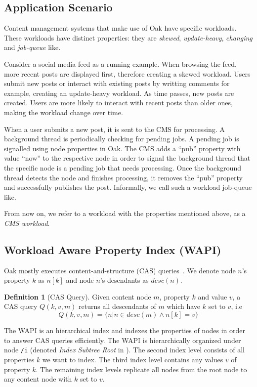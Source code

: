 \documentclass[abstracton,12pt]{scrartcl}
\theoremstyle{definition}
\newtheorem{definition}{Definition}
\begin{document}
\subsection{Application Scenario}
\label{sec:application_scenario}

Content management systems that make use of Oak have specific workloads.
These workloads have distinct properties: they are \textit{skewed},
\textit{update-heavy}, \textit{changing} \cite{KW17} and
\textit{job-queue} like.

Consider a social media feed as a running example. When
browsing the feed, more recent posts are displayed first, therefore creating a
skewed workload. Users submit new posts or interact with existing posts by
writting comments for example, creating an update-heavy workload. As time
passes, new posts are created. Users are more likely to interact with recent
posts than older ones, making the workload change over time.

When a user submits a new post, it is sent to the CMS for processing. A
background thread is periodically checking for pending jobs. A pending job is
signalled using node properties in Oak.
The CMS adds a ``pub'' property with value ``now'' to the respective node  in
order to signal the background thread that the specific node is a pending job that needs
processing. Once the
background thread detects the node and finishes processing, it removes the ``pub'' property and
successfully publishes the post. Informally, we call such a workload
job-queue like.

From now on, we refer to a workload with the properties mentioned above, as
a \textit{CMS workload}.

\subsection{Workload Aware Property Index (WAPI)}
\label{sec:wapi}

Oak mostly executes content-and-structure (CAS) queries~\cite{CM15}.
We denote node $n$'s property $k$ as $n[k]$ and node $n$'s desendants as
$desc(n)$.

\begin{definition}[CAS Query]
  Given content node $m$, property $k$ and value $v$, a CAS query
  $Q(k,v,m)$ returns all descendants of $m$ which have $k$ set to $v$, i.e
  $$ Q(k,v,m) = \{ n | n \in desc(m) \land n[k] = v\} $$
\end{definition}

The WAPI is an hierarchical index and indexes the properties of nodes in order
to answer CAS queries efficiently.
The WAPI is hierarchically organized under node \texttt{/i} (denoted
\textit{Index Subtree Root} in ).
The second index level consists of all properties $k$ we want
to index. The third index level contains any values $v$ of property $k$.
The remaining index levels replicate all nodes from the root node to any
content node with $k$ set to $v$.
\end{document}
